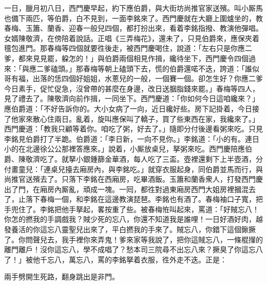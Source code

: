 一日，臘月初八日，西門慶早起，約下應伯爵，與大街坊尚推官家送殯。叫小厮馬也備下兩匹，等伯爵，白不見到，一面李銘來了。西門慶就在大廳上圍爐坐的，教春梅、玉簫、蘭香、迎春一般兒四個，都打扮出來，看着李銘指撥、教演他彈唱。女婿陳敬濟，在傍陪着說話。正唱《三弄梅花》，還未了，只見伯爵來，應保夾着氊包進門。那春梅等四個就要徃後走，被西門慶喝住，說道：「左右只是你應二爹，都來見見罷，躱怎的！」與伯爵兩個相見作揖，纔待坐下，西門慶令四個過來：「與應二爹磕頭。」那春梅等朝上磕頭下去，慌的伯爵還喏不迭，誇道：「誰似哥有福，出落的恁四個好姐姐，水蔥兒的一般，一個賽一個。卻怎生好？你應二爹今日素手，促忙促急，沒曾帶的甚麼在身邊，改日送胭脂錢來罷。」春梅等四人，見了禮去了。陳敬濟向前作揖，一同坐下。西門慶道：「你如何今日這咱纔來？」應伯爵道：「不好告訴你的。大小女病了一向，近日纔好些。房下記掛着，今日接了他家來散心住兩日。亂着，旋叫應保叫了轎子，買了些東西在家，我纔來了。」{}西門慶道：「教我只顧等着你。咱吃了粥，好去了。」隨即分付後邊看粥來吃。只見李銘見伯爵打了半跪。伯爵道：「李日新，一向不見你。」李銘道：「小的有。連日小的在北邊徐公公那裡答應來。」說着，小厮放桌兒，拏粥來吃。西門慶陪應伯爵、陳敬濟吃了。就拏小銀鍾篩金華酒，每人吃了三盃。壺裡還剩下上半壺酒，分付畫童兒：「連桌兒擡去廂房內，與李銘吃。」{}就穿衣服起身，同伯爵並馬而行，與尚推官送殯去了。只落下李銘在西廂房，吃畢酒飯。玉簫和蘭香衆人，打發西門慶出了門，在廂房內厮亂，頑成一塊。{}一囘，都徃對過東廂房西門大姐房裡摑混去了，止落下春梅一個，和李銘在這邊教演琵琶。李銘也有酒了。春梅袖口子寬，把手兜住了。李銘把他手拏起，畧按重了些。被春梅恠叫起來，{}罵道：「好賊忘八！你怎的撚我的手調戲我？賊少死的忘八，你還不知道我是誰哩！{}一日好酒好肉，越發養活的你這忘八靈聖兒出來了，{}平白撚我的手來了。賊忘八，你錯下這個鍬撅了。你問聲兒去，我手裡你來弄鬼！爹來家等我說了，把你這賊忘八，一條棍攆的離門離戶！沒你這忘八，學不成唱了？愁本司三院尋不出忘八來？撅臭了你這忘八了！」被他千忘八，萬忘八，罵的李銘拏着衣服，徃外走不迭。正是：

\begin{myquote} 
兩手劈開生死路，翻身跳出是非門。
\end{myquote} 

